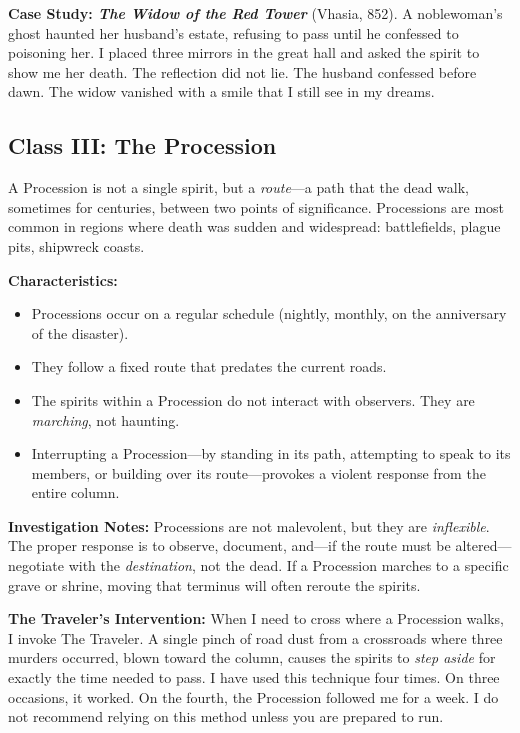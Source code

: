 \textbf{Case Study: \emph{The Widow of the Red Tower}} (Vhasia, 852). A noblewoman's ghost haunted her husband's estate, refusing to pass until he confessed to poisoning her. I placed three mirrors in the great hall and asked the spirit to show me her death. The reflection did not lie. The husband confessed before dawn. The widow vanished with a smile that I still see in my dreams.

\subsection{Class III: The Procession}

A Procession is not a single spirit, but a \emph{route}---a path that the dead walk, sometimes for centuries, between two points of significance. Processions are most common in regions where death was sudden and widespread: battlefields, plague pits, shipwreck coasts.

\textbf{Characteristics:}
\begin{itemize}
  \item Processions occur on a regular schedule (nightly, monthly, on the anniversary of the disaster).
  \item They follow a fixed route that predates the current roads.
  \item The spirits within a Procession do not interact with observers. They are \emph{marching}, not haunting.
  \item Interrupting a Procession---by standing in its path, attempting to speak to its members, or building over its route---provokes a violent response from the entire column.
\end{itemize}

\textbf{Investigation Notes:} Processions are not malevolent, but they are \emph{inflexible}. The proper response is to observe, document, and---if the route must be altered---negotiate with the \emph{destination}, not the dead. If a Procession marches to a specific grave or shrine, moving that terminus will often reroute the spirits.

\textbf{The Traveler's Intervention:} When I need to cross where a Procession walks, I invoke The Traveler. A single pinch of road dust from a crossroads where three murders occurred, blown toward the column, causes the spirits to \emph{step aside} for exactly the time needed to pass. I have used this technique four times. On three occasions, it worked. On the fourth, the Procession followed me for a week. I do not recommend relying on this method unless you are prepared to run.

